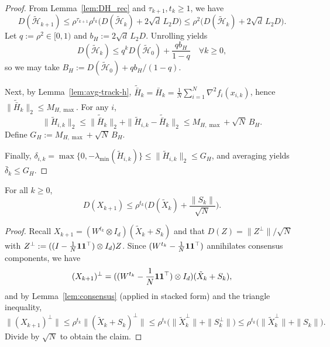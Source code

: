\documentclass[review,onefignum,onetabnum]{siamart171218}
\begin{document}
	\begin{proof}
		From Lemma~\ref{lem:DH_rec} and $\tau_{k+1},t_k\ge 1$, we have
		\[
		D(\tilde{\mathcal H}_{k+1})
		\le \rho^{\tau_{k+1}}\rho^{t_k}\Big(D(\tilde{\mathcal H}_k)+2\sqrt d\,L_2D\Big)
		\le \rho^2\Big(D(\tilde{\mathcal H}_k)+2\sqrt d\,L_2D\Big).
		\]
		Let $q:=\rho^2\in[0,1)$ and $b_H:=2\sqrt d\,L_2D$. Unrolling yields
		\[
		D(\tilde{\mathcal H}_k)\le q^k D(\tilde{\mathcal H}_0)+\frac{qb_H}{1-q}\quad \forall k\ge 0,
		\]
		so we may take $B_H:=D(\tilde{\mathcal H}_0)+qb_H/(1-q)$.
		
		Next, by Lemma~\ref{lem:avg-track-h},
		$\tilde{\bar H}_k=\bar H_k=\frac1N\sum_{i=1}^N\nabla^2 f_i(x_{i,k})$,
		hence $\|\tilde{\bar H}_k\|_2\le M_{H,\max}$.
		For any $i$,
		\[
		\|\tilde H_{i,k}\|_2
		\le \|\tilde{\bar H}_k\|_2
		+ \|\tilde H_{i,k}\!-\!\tilde{\bar H}_k\|_2
		\le M_{H,\max}\!+\!\sqrt{N}\,B_H.
		\]
		Define $G_H:=M_{H,\max} + \sqrt{N}\,B_H$.
		
		Finally, $\delta_{i,k}=\max\{0,-\lambda_{\min}(\tilde H_{i,k})\}
		\le \|\tilde H_{i,k}\|_2\le G_H$,
		and averaging yields $\bar\delta_k\le G_H$.
	\end{proof}
	
	\begin{lemma}\label{lem:DX_post}
		For all $k\ge 0$,
		\[
		D(X_{k+1})\le \rho^{t_k}\Big(D(\tilde X_k)+\frac{\|S_k\|}{\sqrt N}\Big).
		\]
	\end{lemma}
	\begin{proof}
		Recall $X_{k+1}=(W^{t_k}\otimes I_d)(\tilde X_k+S_k)$ and that $D(Z)=\|Z^\perp\|/\sqrt N$ with $Z^\perp:=((I-\frac{1}{N}\mathbf{1}\mathbf{1}^\top)\otimes I_d)Z$.
		Since $(W^{t_k}-\frac{1}{N}\mathbf{1}\mathbf{1}^\top)$ annihilates consensus components, we have
		\[
		(X_{k+1})^\perp = ((W^{t_k}-\frac{1}{N}\mathbf{1}\mathbf{1}^\top)\otimes I_d)(\tilde X_k+S_k),
		\]
		and by Lemma~\ref{lem:consensus} (applied in stacked form) and the triangle inequality,
		\[
		\| (X_{k+1})^\perp\|
		\le \rho^{t_k}\|(\tilde X_k+S_k)^\perp\|
		\le \rho^{t_k}\big(\|\tilde X_k^\perp\|+\|S_k^\perp\|\big)
		\le \rho^{t_k}\big(\|\tilde X_k^\perp\|+\|S_k\|\big).
		\]
		Divide by $\sqrt N$ to obtain the claim.
	\end{proof}
	
\end{document}
